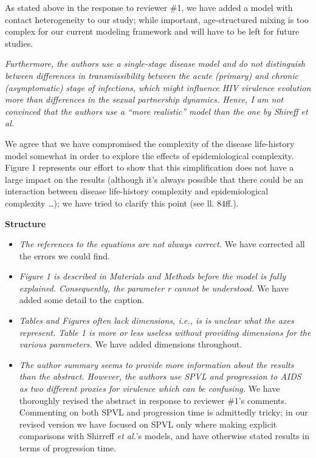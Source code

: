 \documentclass[10pt]{letter}
\newcommand{\revcomment}[1]{\emph{#1}}
\newcommand{\response}[1]{#1}
\begin{document}
\begin{letter}{
}
\response{As stated above in the response to reviewer \#1, we have
added a model with contact heterogeneity to our study; while
important, age-structured mixing is too complex for our current
modeling framework and will have to be left for future studies.}

\revcomment{
 Furthermore, the authors use a single-stage disease
model and do not distinguish between differences in transmissibility
between the acute (primary) and chronic (asymptomatic) stage of
infections, which might influence HIV virulence evolution more than
differences in the sexual partnership dynamics. Hence, I am not
convinced that the authors use a “more realistic” model than the one by
Shireff et al.}

\response{We agree that we have compromised the complexity of
the disease life-history model somewhat in order to explore 
the effects of epidemiological complexity.
Figure 1 represents our effort to show that
this simplification does not have a large impact on the results
(although it's always possible that there could be an interaction
between disease life-history complexity and epidemiological complexity
\ldots); we have tried to clarify this point (see ll. 84ff.).

\textbf{Structure}

\begin{itemize}
\item \revcomment{The references to the equations are not always correct.}
\response{We have corrected all the errors we could find.}
\item \revcomment{Figure 1 is described in Materials and Methods before the model is fully explained. Consequently, the parameter r cannot be understood.}
\response{We have added some detail to the caption.}
\item \revcomment{Tables and Figures often lack dimensions, i.e., is is unclear what the axes represent. Table 1 is more or less useless without providing
dimensions for the various parameters.}
\response{We have added dimensions throughout.}
\item \revcomment{The author summary seems to provide more information about the results than the abstract. However, the authors use SPVL and progression to AIDS as two different proxies for virulence which can be confusing.}
\response{We have thoroughly revised the abstract in response to reviewer \#1's comments. Commenting on both SPVL and progression time is admittedly tricky; in our revised version we have focused on SPVL only where making explicit comparisons with Shirreff \emph{et al.}'s models, and have otherwise stated results in terms of progression time.}
\end{itemize}

}
\end{letter}
\end{document}
